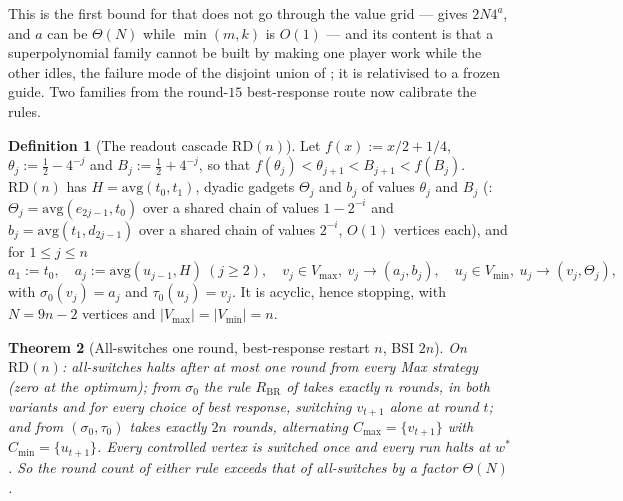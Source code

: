 \documentclass[11pt]{article}
\theoremstyle{plain}
\newtheorem{theorem}{Theorem}[section]
\theoremstyle{definition}
\newtheorem{definition}[theorem]{Definition}
\newcommand{\Vmax}{V_{\max}}
\newcommand{\Vmin}{V_{\min}}
\begin{document}
This is the first bound for  that does not go through the
value grid ---  gives $2N4^{a}$, and $a$ can be
$\Theta(N)$ while $\min(m,k)$ is $O(1)$ --- and its content is that a
superpolynomial family cannot be built by making one player work while
the other idles, the failure mode of the disjoint union of
; it is  relativised to a
frozen guide. Two families from the round-$15$ best-response route now
calibrate the rules.

\begin{definition}[The readout cascade $\mathrm{RD}(n)$]\label{def:readout-cascade}
Let $f(x):=x/2+1/4$, $\theta_j:=\tfrac12-4^{-j}$ and $B_j:=\tfrac12+4^{-j}$,
so that $f(\theta_j)<\theta_{j+1}<B_{j+1}<f(B_j)$. $\mathrm{RD}(n)$ has
$H=\mathrm{avg}(t_0,t_1)$, dyadic gadgets $\Theta_j$ and $b_j$ of values
$\theta_j$ and $B_j$ (: $\Theta_j=\mathrm{avg}(e_{2j-1},t_0)$
over a shared chain of values $1-2^{-i}$ and $b_j=\mathrm{avg}(t_1,d_{2j-1})$
over a shared chain of values $2^{-i}$, $O(1)$ vertices each), and for $1\le j\le n$
\[
  a_1:=t_0,\quad a_j:=\mathrm{avg}(u_{j-1},H)\ (j\ge2),\quad
  v_j\in\Vmax,\ v_j\to(a_j,b_j),\quad u_j\in\Vmin,\ u_j\to(v_j,\Theta_j),
\]
with $\sigma_0(v_j)=a_j$ and $\tau_0(u_j)=v_j$. It is acyclic, hence
stopping, with $N=9n-2$ vertices and $|\Vmax|=|\Vmin|=n$.
\end{definition}

\begin{theorem}[All-switches one round, best-response restart $n$, BSI $2n$]\label{thm:readout}
On $\mathrm{RD}(n)$: all-switches halts after at most one round from
every Max strategy (zero at the optimum); from $\sigma_0$ the rule $R_{\mathrm{BR}}$ of
 takes exactly $n$ rounds, in both variants and for
every choice of best response, switching $v_{t+1}$ alone at round $t$;
and  from $(\sigma_0,\tau_0)$ takes exactly $2n$ rounds,
alternating $C_{\max}=\{v_{t+1}\}$ with $C_{\min}=\{u_{t+1}\}$. Every
controlled vertex is switched once and every run halts at $w^{\ast}$. So
the round count of either rule exceeds that of all-switches by a factor
$\Theta(N)$.
\end{theorem}
\end{document}
